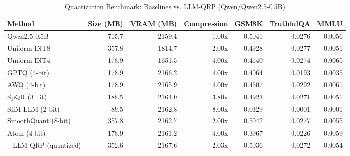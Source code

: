 \begin{table}[htbp]
  \centering
  \small
  \caption{Quantization Benchmark: Baselines vs. LLM-QRP (Qwen/Qwen2.5-0.5B)}
  \label{tab:benchmark}
  \begin{tabular}{lrrrrrr}
    \toprule
    \textbf{Method} & \textbf{Size (MB)} & \textbf{VRAM (MB)} & \textbf{Compression} & \textbf{GSM8K} & \textbf{TruthfulQA} & \textbf{MMLU} \\
    \midrule
    Qwen2.5-0.5B & 715.7 & 2159.4 & 1.00x & 0.5041 & 0.0276 & 0.0056 \\
    Uniform INT8 & 357.8 & 1814.7 & 2.00x & 0.4928 & 0.0277 & 0.0051 \\
    Uniform INT4 & 178.9 & 1651.5 & 4.00x & 0.4140 & 0.0274 & 0.0065 \\
    GPTQ (4-bit) & 178.9 & 2166.2 & 4.00x & 0.4064 & 0.0193 & 0.0035 \\
    AWQ (4-bit) & 178.9 & 2165.9 & 4.00x & 0.4607 & 0.0292 & 0.0061 \\
    SpQR (3-bit) & 188.5 & 2164.0 & 3.80x & 0.4923 & 0.0271 & 0.0051 \\
    SliM-LLM (2-bit) & 89.5 & 2162.8 & 8.00x & 0.0329 & 0.0001 & 0.0001 \\
    SmoothQuant (8-bit) & 357.8 & 2162.7 & 2.00x & 0.5042 & 0.0277 & 0.0055 \\
    Atom (4-bit) & 178.9 & 2161.2 & 4.00x & 0.3967 & 0.0226 & 0.0059 \\
    \midrule
    +LLM-QRP (quantized) & 352.6 & 2167.6 & 2.03x & 0.5036 & 0.0272 & 0.0054 \\
    \bottomrule
  \end{tabular}
\end{table}
